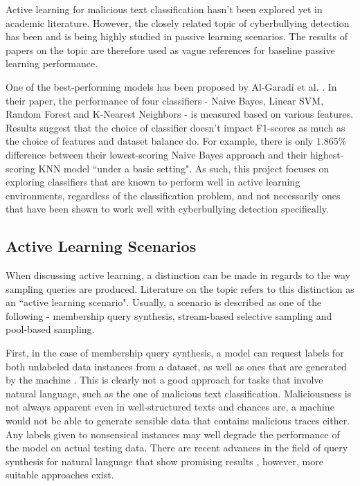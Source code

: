 \documentclass[a4paper,12pt]{article}
\begin{document}
Active learning for malicious text classification hasn't been explored yet in academic literature. However, the closely related topic of cyberbullying detection has been and is being highly studied in passive learning scenarios. The results of papers on the topic are therefore used as vague references for baseline passive learning performance.

One of the best-performing models has been proposed by Al-Garadi et al. \cite{garadi-highestf/top10features}. In their paper, the performance of four classifiers - Naive Bayes, Linear SVM, Random Forest and K-Nearest Neighbors - is measured based on various features. Results suggest that the choice of classifier doesn't impact F1-scores as much as the choice of features and dataset balance do. For example, there is only $1.865\%$ difference between their lowest-scoring Naive Bayes approach and their highest-scoring KNN model ``under a basic setting". As such, this project focuses on exploring classifiers that are known to perform well in active learning environments, regardless of the classification problem, and not necessarily ones that have been shown to work well with cyberbullying detection specifically.
\subsection{Active Learning Scenarios}
When discussing active learning, a distinction can be made in regards to the way sampling queries are produced. Literature on the topic refers to this distinction as an ``active learning scenario". Usually, a scenario is described as one of the following - membership query synthesis, stream-based selective sampling and pool-based sampling.

First, in the case of membership query synthesis, a model can request labels for both unlabeled data instances from a dataset, as well as ones that are generated by the machine \cite{Settles2009}. This is clearly not a good approach for tasks that involve natural language, such as the one of malicious text classification. Maliciousness is not always apparent even in well-structured texts and chances are, a machine would not be able to generate sensible data that contains malicious traces either. Any labels given to nonsensical instances may well degrade the performance of the model on actual testing data. There are recent advances in the field of query synthesis for natural language that show promising results \cite{schumann-rehbein-2019-active}, however, more suitable approaches exist.
\end{document}
